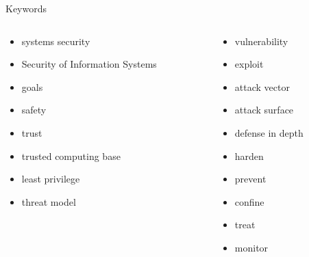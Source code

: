 \documentclass{curs}
\begin{document}
\begin{frame}{Keywords}
  \begin{columns}
    \begin{column}{0.5\textwidth}
      \begin{itemize}
        \item systems security
        \item Security of Information Systems
        \item goals
        \item safety
        \item trust
        \item trusted computing base
        \item least privilege
        \item threat model
      \end{itemize}
    \end{column}
    \begin{column}{0.5\textwidth}
      \begin{itemize}
        \item vulnerability
        \item exploit
        \item attack vector
        \item attack surface
        \item defense in depth
        \item harden
        \item prevent
        \item confine
        \item treat
        \item monitor
      \end{itemize}
    \end{column}
  \end{columns}
\end{frame}
\end{document}
